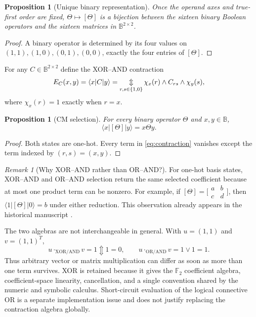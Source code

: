 \documentclass[11pt]{article}
\newtheorem{proposition}[theorem]{Proposition}
\theoremstyle{definition}
\theoremstyle{remark}
\newtheorem{remark}[theorem]{Remark}
\newcommand{\B}{\mathbb B}
\newcommand{\F}{\mathbb F}
\newcommand{\xor}{\mathbin{\Updownarrow}}
\newcommand{\bigxor}{\mathop{\Updownarrow}\displaylimits}
\begin{document}
\begin{proposition}[Unique binary representation]
Once the operand axes and true-first order are fixed, $\Theta\mapsto[\Theta]$ is a bijection between the sixteen binary Boolean operators and the sixteen matrices in $\B^{2\times2}$.
\end{proposition}
\begin{proof}
A binary operator is determined by its four values on $(1,1),(1,0),(0,1),(0,0)$, exactly the four entries of $[\Theta]$.
\end{proof}

For any $C\in\B^{2\times2}$ define the XOR--AND contraction
\begin{equation}
 E_C(x,y)=\langle x|C|y\rangle
 =\bigxor_{r,s\in\{1,0\}}
 \chi_x(r)\land C_{rs}\land\chi_y(s),
 \label{eq:contraction}
\end{equation}
where $\chi_x(r)=1$ exactly when $r=x$.

\begin{proposition}[CM selection]
\label{prop:cmselection}
For every binary operator $\Theta$ and $x,y\in\B$,
\[
 \langle x|[\Theta]|y\rangle=x\Theta y.
\]
\end{proposition}
\begin{proof}
Both states are one-hot.  Every term in \eqref{eq:contraction} vanishes except the term indexed by $(r,s)=(x,y)$.
\end{proof}

\begin{remark}[Why XOR--AND rather than OR--AND?]
For one-hot basis states, XOR--AND and OR--AND selection return the same selected coefficient because at most one product term can be nonzero.  For example, if $[\Theta]=\bigl[\begin{smallmatrix}a&b\\c&d\end{smallmatrix}\bigr]$, then $\langle1|[\Theta]|0\rangle=b$ under either reduction.  This observation already appears in the historical manuscript \cite{Droncheff2018}.

The two algebras are not interchangeable in general.  With $u=(1,1)$ and $v=(1,1)^T$,
\[
 u\cdot_{\mathrm{XOR/AND}}v=1\xor1=0,
 \qquad
 u\cdot_{\mathrm{OR/AND}}v=1\lor1=1.
\]
Thus arbitrary vector or matrix multiplication can differ as soon as more than one term survives.  XOR is retained because it gives the $\F_2$ coefficient algebra, coefficient-space linearity, cancellation, and a single convention shared by the numeric and symbolic calculus.  Short-circuit evaluation of the logical connective OR is a separate implementation issue and does not justify replacing the contraction algebra globally.
\end{remark}
\end{document}

